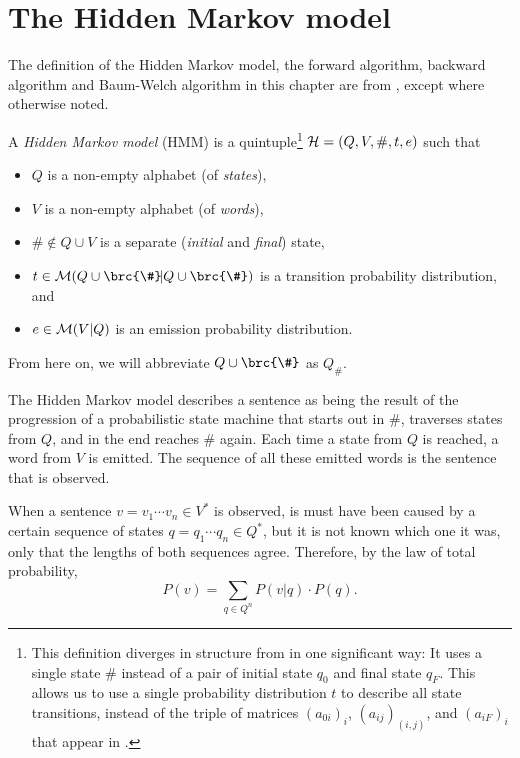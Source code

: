 \chapter{The Hidden Markov model}

The definition of the Hidden Markov model, the forward algorithm, backward
algorithm and Baum-Welch algorithm in this chapter are from
\cite[pp.~210]{jm09}, except where otherwise noted.

\begin{definition}
 A \emph{Hidden Markov model} (HMM) is a quintuple\footnote{This definition
 diverges in structure from \cite{jm09} in one significant way: It uses a
 single state $\#$ instead of a pair of initial state $q_0$ and final state
 $q_F$. This allows us to use a single probability distribution $t$ to describe
 all state transitions, instead of the triple of matrices $(a_{0i})_i$,
 $(a_{ij})_{(i,j)}$, and $(a_{iF})_i$ that appear in \cite{jm09}.} $\mathcal H =
 (Q,V,\#,t,e)$ such that
 \begin{itemize}\setlength\itemsep{-0.3em}
  \item $Q$ is a non-empty alphabet (of \emph{states}),
  \item $V$ is a non-empty alphabet (of \emph{words}),
  \item $\#\notin Q\cup V$ is a separate (\emph{initial} and \emph{final}) state,
  \item $t\in\um(Q\cup\brc{\#}\!|Q\cup\brc{\#})$ is a transition probability distribution, and
  \item $e\in\mathcal M(V|Q)$ is an emission probability distribution. \qedhere
 \end{itemize}
\end{definition}

From here on, we will abbreviate $Q\cup\brc{\#}$ as $Q_\#$.

The Hidden Markov model describes a sentence as being the result of the
progression of a probabilistic state machine that starts out in $\#$, traverses
states from $Q$, and in the end reaches $\#$ again. Each time a state from $Q$
is reached, a word from $V$ is emitted. The sequence of all these emitted words
is the sentence that is observed.

When a sentence $v = v_1\cdots v_n\in V^*$ is observed, is must have been
caused by a certain sequence of states $q = q_1\cdots q_n\in Q^*$, but it is
not known which one it was, only that the lengths of both sequences agree.
Therefore, by the law of total probability,
\[
 P(v) = \sum_{q\in Q^n} P(v|q) \cdot P(q).
\]

